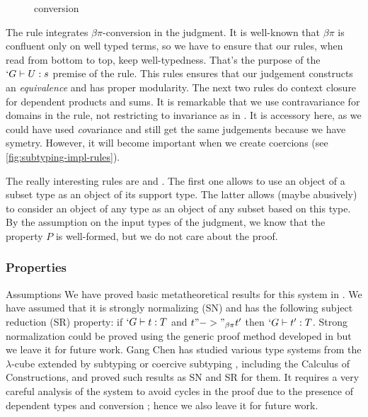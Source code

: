 \documentclass[twocolumn]{article}
\begin{document}
\begin{figure}[h]
  \subtdRules
  \caption{\Russell{} conversion}
  \label{fig:conversion-decl-rules}
\end{figure}

The rule  integrates $\beta\pi$-conversion in the
judgment. It is well-known \cite{Luo, Pottinger?} that $\beta\pi$ is
confluent only on well typed terms, so we have to ensure that our rules,
when read from bottom to top, keep well-typedness. That's the purpose of
the $`G \vdash U : s$ premise of the  rule. This rules
ensures that our judgement constructs an \emph{equivalence} and has
proper modularity. The next two rules do context closure for dependent
products and sums. It is remarkable that we use contravariance for
domains in the  rule, not restricting to invariance as in
\PVS \cite{journals/toplas/Castagna95}. It is accessory here, as we could have used \emph{co}variance and
still get the same judgements because we have symetry. However, it will
become important when we create coercions (see
\vref{fig:subtyping-impl-rules}).

The really interesting rules are  and
. The first one allows to use an object of a subset type
as an object of its support type. The latter allows (maybe abusively) to
consider an object of any type as an object of any subset based on
this type. By the assumption on the input types of the judgment, we know
that the property $P$ is well-formed, but we do not care about the proof.

\subsubsection{Properties}
\begin{paragraph}{Assumptions}
  We have proved basic metatheoretical results for this system in \Coq{}
  \cite{CCP}. We have assumed that it is strongly normalizing (SN) and has the
  following subject reduction (SR) property: if $`G \vdash t : T$ and $t
  "->"_{\beta\pi} t'$ then $`G \vdash t' : T$. Strong normalization
  could be proved using the generic proof method developed in
  \cite{Geuvers} but we leave it for future work. Gang Chen
  \cite{GangChen} has studied various type systems from the
  $\lambda$-cube extended by subtyping or coercive subtyping \cite{Luo},
  including the Calculus of Constructions, and proved such results as
  SN and SR for them. It requires a very careful analysis of the system 
  to avoid cycles in the proof due to the presence of dependent types and
  conversion ; hence we also leave it for future work.
\end{paragraph}
\end{document}

